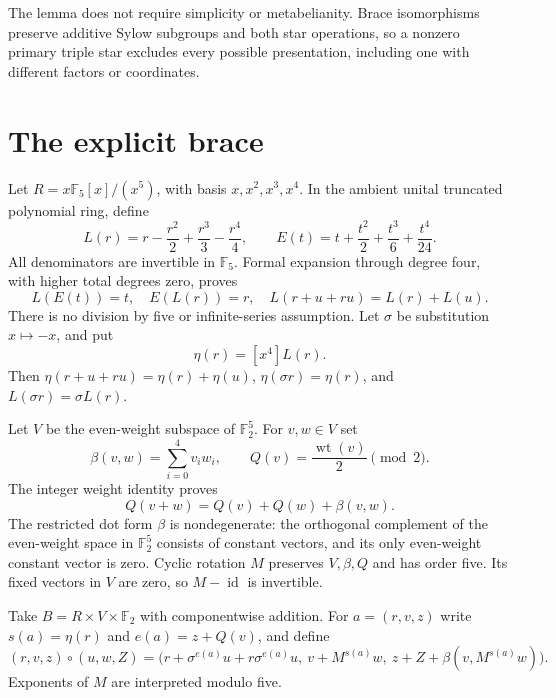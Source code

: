\documentclass[11pt]{article}
\newcommand{\F}{\mathbb F}
\newcommand{\id}{\operatorname{id}}
\newcommand{\wt}{\operatorname{wt}}
\begin{document}
The lemma does not require simplicity or metabelianity.
Brace isomorphisms preserve additive Sylow subgroups and both star
operations, so a nonzero primary triple star excludes every possible
presentation, including one with different factors or coordinates.

\section{The explicit brace}
Let $R=x\F_5[x]/(x^5)$, with basis $x,x^2,x^3,x^4$.
In the ambient unital truncated polynomial ring, define
\[
 L(r)=r-\frac{r^2}{2}+\frac{r^3}{3}-\frac{r^4}{4},
 \qquad E(t)=t+\frac{t^2}{2}+\frac{t^3}{6}+\frac{t^4}{24}.
\]
All denominators are invertible in $\F_5$. Formal expansion through
degree four, with higher total degrees zero, proves
\begin{equation}\label{eq:log}
 L(E(t))=t,\quad E(L(r))=r,\quad
 L(r+u+ru)=L(r)+L(u).
\end{equation}
There is no division by five or infinite-series assumption.
Let $\sigma$ be substitution $x\mapsto-x$, and put
\[
                           \eta(r)=[x^4]L(r).
\]
Then $\eta(r+u+ru)=\eta(r)+\eta(u)$,
$\eta(\sigma r)=\eta(r)$, and $L(\sigma r)=\sigma L(r)$.

Let $V$ be the even-weight subspace of $\F_2^5$. For $v,w\in V$ set
\[
 \beta(v,w)=\sum_{i=0}^4v_iw_i,\qquad
 Q(v)=\frac{\wt(v)}2\pmod2.
\]
The integer weight identity proves
\begin{equation}\label{eq:quadratic}
 Q(v+w)=Q(v)+Q(w)+\beta(v,w).
\end{equation}
The restricted dot form $\beta$ is nondegenerate: the orthogonal
complement of the even-weight space in $\F_2^5$ consists of constant
vectors, and its only even-weight constant vector is zero.
Cyclic rotation $M$ preserves $V,\beta,Q$ and has order five.
Its fixed vectors in $V$ are zero, so $M-\id$ is invertible.

Take $B=R\times V\times\F_2$ with componentwise addition. For
$a=(r,v,z)$ write $s(a)=\eta(r)$ and $e(a)=z+Q(v)$, and define
\begin{equation}\label{eq:direct}
 (r,v,z)\circ(u,w,Z)=
 \bigl(r+\sigma^{e(a)}u+r\sigma^{e(a)}u,\
       v+M^{s(a)}w,\
       z+Z+\beta(v,M^{s(a)}w)\bigr).
\end{equation}
Exponents of $M$ are interpreted modulo five.
\end{document}
